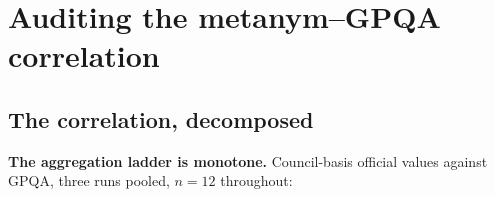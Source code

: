 \documentclass{article}
\begin{document}
\section{Auditing the metanym--GPQA correlation}\label{auditing-the-metanymgpqa-correlation}

\subsection{The correlation, decomposed}\label{the-correlation-decomposed}

\textbf{The aggregation ladder is monotone.} Council-basis official values against GPQA, three runs pooled, \(n = 12\) throughout:

\begin{table}[H]
\caption{The aggregation ladder. Two interval constructions are reported because each covers the other's weakness at \(n = 12\): Fisher-\(z\) assumes bivariate normality but unbends the skew of a bounded statistic; the BCa bootstrap is assumption-lighter and corrects the bias that makes the naive percentile bootstrap anti-conservative here. Where they disagree, the wider bound is the honest one.}
\begin{center}\small
{}
\end{center}
\end{table}
\end{document}
